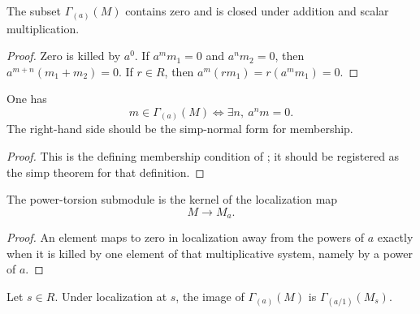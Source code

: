 \begin{lemma}
  \label{lemma:nagata-power-torsion-submodule}

  The subset $\Gamma_{(a)}(M)$ contains zero and is closed under addition and
  scalar multiplication.
\end{lemma}

\begin{proof}
  Zero is killed by $a^0$.  If $a^mm_1=0$ and $a^nm_2=0$, then
  $a^{m+n}(m_1+m_2)=0$.  If $r\in R$, then
  $a^m(rm_1)=r(a^mm_1)=0$.
\end{proof}

\begin{lemma}
  \label{lemma:nagata-mem-power-torsion}

  One has
  \[
    m\in\Gamma_{(a)}(M)
      \Longleftrightarrow
    \exists n,\ a^nm=0.
  \]
  The right-hand side should be the simp-normal form for membership.
\end{lemma}

\begin{proof}
  This is the defining membership condition of
  ; it should be registered as the simp theorem
  for that definition.
\end{proof}

\begin{lemma}
  \label{lemma:nagata-power-torsion-kernel-localization}

  The power-torsion submodule is the kernel of the localization map
  \[
    M\longrightarrow M_a.
  \]
\end{lemma}

\begin{proof}
  An element maps to zero in localization away from the powers of $a$ exactly
  when it is killed by one element of that multiplicative system, namely by a
  power of $a$.
\end{proof}

\begin{lemma}
  \label{lemma:nagata-power-torsion-localization}

  Let $s\in R$.  Under localization at $s$, the image of
  $\Gamma_{(a)}(M)$ is
  $\Gamma_{(a/1)}(M_s)$.
\end{lemma}

